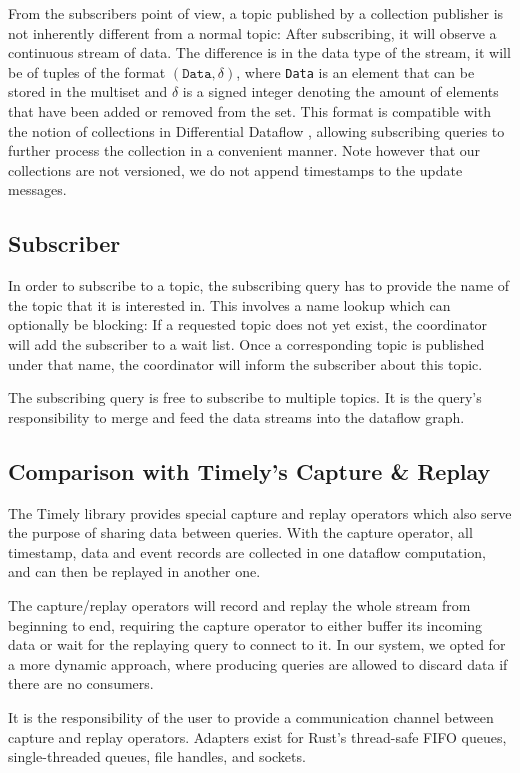 From the subscribers point of view, a topic published by a collection publisher
is not inherently different from a normal topic: After subscribing, it will
observe a continuous stream of data. The difference is in the data type of the
stream, it will be of tuples of the format $(\texttt{Data}, \delta)$, where
\texttt{Data} is an element that can be stored in the multiset and $\delta$ 
is a signed integer denoting the amount of elements that have been added or removed from the set.
This format is compatible with the notion of collections in Differential Dataflow \cite{differential},
allowing subscribing queries to further process the collection in a convenient
manner. Note however that our collections are not versioned, we
do not append timestamps to the update messages.

\subsection{Subscriber}

In order to subscribe to a topic, the subscribing query has to provide the name
of the topic that it is interested in. This involves a name lookup which can optionally
be blocking: If a requested topic does not yet exist, the coordinator will add
the subscriber to a wait list. Once a corresponding topic is published under that
name, the coordinator will inform the subscriber about this topic. 

The subscribing query is free to subscribe to multiple topics. It is the query's
responsibility to merge and feed the data streams into the dataflow graph.

\subsection{Comparison with Timely's Capture \& Replay}

The Timely library provides special capture and replay operators which also serve the
purpose of sharing data between queries. With the capture operator, all timestamp,
data and event records are collected in one dataflow computation,
and can then be replayed in another one.

The capture/replay operators will record and replay the whole stream from beginning
to end, requiring the capture operator to either buffer its incoming data or
wait for the replaying query to connect to it. 
In our system, we opted for a more dynamic approach, where
producing queries are allowed to discard data if there are no consumers.

It is the responsibility of the user to provide a communication channel between
capture and  replay operators. Adapters exist for Rust's thread-safe FIFO queues,
single-threaded queues, file handles, and sockets.

